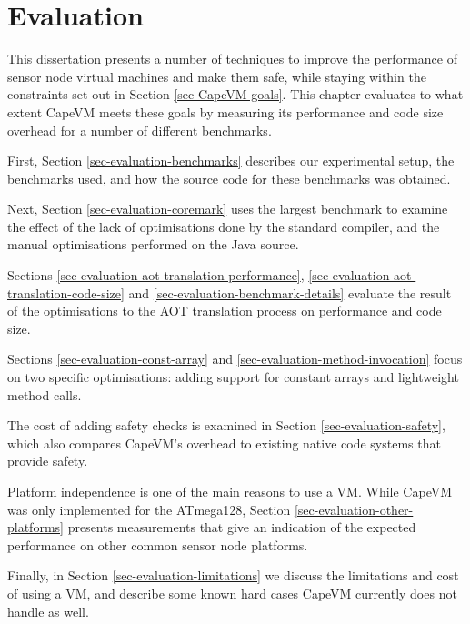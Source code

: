 \chapter{Evaluation}
\label{sec-evaluation}
This dissertation presents a number of techniques to improve the performance of sensor node virtual machines and make them safe, while staying within the constraints set out in Section \ref{sec-CapeVM-goals}. This chapter evaluates to what extent CapeVM meets these goals by measuring its performance and code size overhead for a number of different benchmarks.

First, Section \ref{sec-evaluation-benchmarks} describes our experimental setup, the benchmarks used, and how the source code for these benchmarks was obtained.

Next, Section \ref{sec-evaluation-coremark} uses the largest benchmark to examine the effect of the lack of optimisations done by the standard  compiler, and the manual optimisations performed on the Java source.

Sections \ref{sec-evaluation-aot-translation-performance}, \ref{sec-evaluation-aot-translation-code-size} and \ref{sec-evaluation-benchmark-details} evaluate the result of the optimisations to the AOT translation process on performance and code size.

Sections \ref{sec-evaluation-const-array} and \ref{sec-evaluation-method-invocation} focus on two specific optimisations: adding support for constant arrays and lightweight method calls.

The cost of adding safety checks is examined in Section \ref{sec-evaluation-safety}, which also compares CapeVM's overhead to existing native code systems that provide safety.

Platform independence is one of the main reasons to use a VM. While CapeVM was only implemented for the ATmega128, Section \ref{sec-evaluation-other-platforms} presents measurements that give an indication of the expected performance on other common sensor node platforms.

Finally, in Section \ref{sec-evaluation-limitations} we discuss the limitations and cost of using a VM, and describe some known hard cases CapeVM currently does not handle as well.
